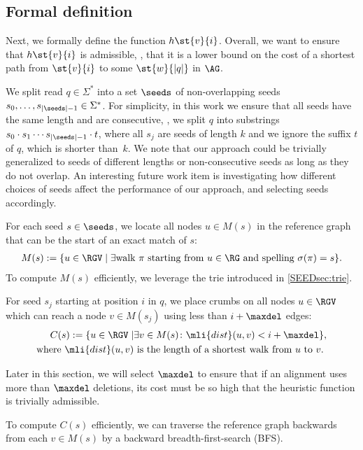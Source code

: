 \subsection{Formal definition} \label{SEEDsec:definition}
%
Next, we formally define the \seedh function $h\st{v}{i}$. Overall, we want to
ensure that $h\st{v}{i}$ is admissible, \ie, that it is a lower bound on the
cost of a shortest path from $\st{v}{i}$ to some $\st{w}{|q|}$ in $\AG$.

%
We split read $q \in \Sigma^*$ into a set $\seeds$ of non-overlapping seeds
$s_0, \dots, s_{|\seeds|-1} \in \Sigma^*$.
%
For simplicity, in this work we ensure that all seeds have the same length and
are consecutive, \ie, we split $q$ into substrings $s_0 \cdot s_1 \cdots
s_{|\seeds|-1} \cdot t$, where all $s_j$ are seeds of length $k$ and we ignore
the suffix $t$ of $q$, which is shorter than~$k$.
%
We note that our approach could be trivially generalized to seeds of different
lengths or non-consecutive seeds as long as they do not overlap. An interesting
future work item is investigating how different choices of seeds affect the
performance of our approach, and selecting seeds accordingly.

%
For each seed $s \in \seeds$, we locate all nodes $u \in M(s)$ in the reference
graph that can be the start of an exact match of $s$:
%
\begin{align*}
	M(s) := \{u \in \RGV \mid \exists \text{walk } \pi \text{ starting from } u \in \RG \text{ and spelling } \sigma(\pi) = s \}.
\end{align*}
%
To compute $M(s)$ efficiently, we leverage the trie introduced in
\cref{SEEDsec:trie}.

For seed $s_j$ starting at position $i$ in $q$, we place crumbs on all nodes $u
\in \RGV$ which can reach a node $v \in M(s_j)$ using less than $i+\maxdel$
edges:
%
\begin{align*}
	C(s) := \{u \in \RGV \mid & \exists v \in M(s)\colon \mli{dist}(u, v) < i + \maxdel \},\\
	\text{where }\mli{dist}(u, v) &\text{ is the length of a shortest walk from } u \text{ to } v.
\end{align*}

Later in this section, we will select $\maxdel$ to ensure that if an alignment
uses more than $\maxdel$ deletions, its cost must be so high that the heuristic
function is trivially admissible.

To compute $C(s)$ efficiently, we can traverse the reference graph backwards
from each $v \in M(s)$ by a backward breadth-first-search (BFS).

